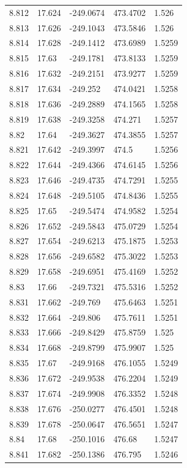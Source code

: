 \begin{tabular}{lllll}
8.812 & 17.624 & -249.0674 & 473.4702 & 1.526 \\
8.813 & 17.626 & -249.1043 & 473.5846 & 1.526 \\
8.814 & 17.628 & -249.1412 & 473.6989 & 1.5259 \\
8.815 & 17.63 & -249.1781 & 473.8133 & 1.5259 \\
8.816 & 17.632 & -249.2151 & 473.9277 & 1.5259 \\
8.817 & 17.634 & -249.252 & 474.0421 & 1.5258 \\
8.818 & 17.636 & -249.2889 & 474.1565 & 1.5258 \\
8.819 & 17.638 & -249.3258 & 474.271 & 1.5257 \\
8.82 & 17.64 & -249.3627 & 474.3855 & 1.5257 \\
8.821 & 17.642 & -249.3997 & 474.5 & 1.5256 \\
8.822 & 17.644 & -249.4366 & 474.6145 & 1.5256 \\
8.823 & 17.646 & -249.4735 & 474.7291 & 1.5255 \\
8.824 & 17.648 & -249.5105 & 474.8436 & 1.5255 \\
8.825 & 17.65 & -249.5474 & 474.9582 & 1.5254 \\
8.826 & 17.652 & -249.5843 & 475.0729 & 1.5254 \\
8.827 & 17.654 & -249.6213 & 475.1875 & 1.5253 \\
8.828 & 17.656 & -249.6582 & 475.3022 & 1.5253 \\
8.829 & 17.658 & -249.6951 & 475.4169 & 1.5252 \\
8.83 & 17.66 & -249.7321 & 475.5316 & 1.5252 \\
8.831 & 17.662 & -249.769 & 475.6463 & 1.5251 \\
8.832 & 17.664 & -249.806 & 475.7611 & 1.5251 \\
8.833 & 17.666 & -249.8429 & 475.8759 & 1.525 \\
8.834 & 17.668 & -249.8799 & 475.9907 & 1.525 \\
8.835 & 17.67 & -249.9168 & 476.1055 & 1.5249 \\
8.836 & 17.672 & -249.9538 & 476.2204 & 1.5249 \\
8.837 & 17.674 & -249.9908 & 476.3352 & 1.5248 \\
8.838 & 17.676 & -250.0277 & 476.4501 & 1.5248 \\
8.839 & 17.678 & -250.0647 & 476.5651 & 1.5247 \\
8.84 & 17.68 & -250.1016 & 476.68 & 1.5247 \\
8.841 & 17.682 & -250.1386 & 476.795 & 1.5246 \\

\end{tabular}
